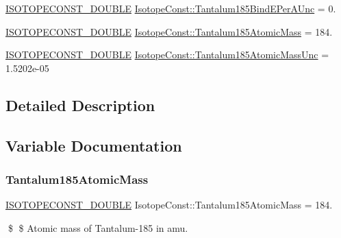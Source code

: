 \begin{DoxyCompactItemize}
\mbox{\hyperlink{group___isotope_const-_macros_ga8f45a7272ce02c0b4c65c44636ed719a}{I\+S\+O\+T\+O\+P\+E\+C\+O\+N\+S\+T\+\_\+\+D\+O\+U\+B\+LE}} \mbox{\hyperlink{group___isotope_const-_tantalum-_ta185_gae15377de0788a27a8a36ee3a4668c3ff}{Isotope\+Const\+::\+Tantalum185\+Bind\+E\+Per\+A\+Unc}} = 0.
\item 
\mbox{\hyperlink{group___isotope_const-_macros_ga8f45a7272ce02c0b4c65c44636ed719a}{I\+S\+O\+T\+O\+P\+E\+C\+O\+N\+S\+T\+\_\+\+D\+O\+U\+B\+LE}} \mbox{\hyperlink{group___isotope_const-_tantalum-_ta185_ga371b885d43359df580204eda1daf4a04}{Isotope\+Const\+::\+Tantalum185\+Atomic\+Mass}} = 184.
\item 
\mbox{\hyperlink{group___isotope_const-_macros_ga8f45a7272ce02c0b4c65c44636ed719a}{I\+S\+O\+T\+O\+P\+E\+C\+O\+N\+S\+T\+\_\+\+D\+O\+U\+B\+LE}} \mbox{\hyperlink{group___isotope_const-_tantalum-_ta185_gab0877ceeb5fa2e39324af60c0248ad10}{Isotope\+Const\+::\+Tantalum185\+Atomic\+Mass\+Unc}} = 1.\+5202e-\/05
\end{DoxyCompactItemize}


\subsection{Detailed Description}


\subsection{Variable Documentation}
\mbox{\label{group___isotope_const-_tantalum-_ta185_ga371b885d43359df580204eda1daf4a04}} 
\subsubsection{\texorpdfstring{Tantalum185\+Atomic\+Mass}{Tantalum185AtomicMass}}
{\footnotesize\ttfamily \mbox{\hyperlink{group___isotope_const-_macros_ga8f45a7272ce02c0b4c65c44636ed719a}{I\+S\+O\+T\+O\+P\+E\+C\+O\+N\+S\+T\+\_\+\+D\+O\+U\+B\+LE}} Isotope\+Const\+::\+Tantalum185\+Atomic\+Mass = 184.}

\$ \$ Atomic mass of Tantalum-\/185 in amu. \mbox{\label{group___isotope_const-_tantalum-_ta185_gab0877ceeb5fa2e39324af60c0248ad10}} 
